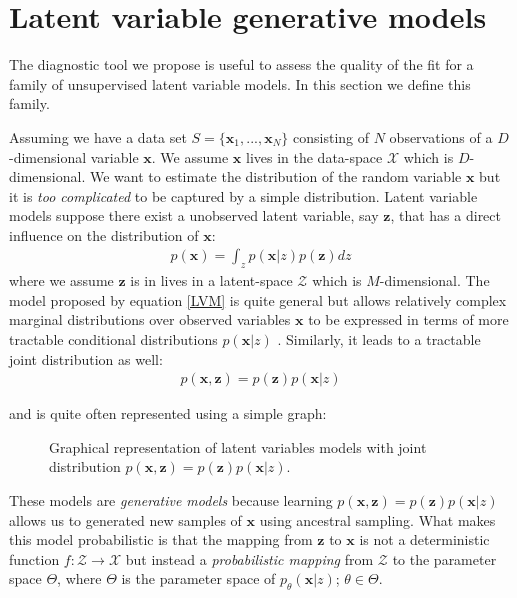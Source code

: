 \documentclass{article}
\newcommand{\x}{\mathbf{x}}
\newcommand{\z}{\mathbf{z}}
\begin{document}
\section{Latent variable generative models}\label{lvm}

The diagnostic tool we propose is useful to assess the quality of the fit for a family of unsupervised latent variable models. In this section we define this family.

\bigskip

Assuming we have a data set $S= \{\mathbf{x}_1,...,\mathbf{x}_N\}$ consisting of $N$ observations of a $D$-dimensional variable $\mathbf{x}$. We assume $\x$ lives in the data-space $\mathcal{X}$ which is $D$-dimensional. We want to estimate the distribution of the random variable $\mathbf{x}$ but it is \textit{too complicated} to be captured by a simple distribution. Latent variable models suppose there exist a unobserved latent variable, say $\mathbf{z}$, that has a direct influence on the distribution of $\mathbf{x}$:
\begin{align}
p(\x) = \int_{z} p(\x|z)p(\z) dz
\label{LVM}
\end{align}
where we assume $\z$ is in lives in a latent-space $\mathcal{Z}$ which is $M$-dimensional. The model proposed by equation \ref{LVM} is quite general but allows relatively complex marginal distributions over observed variables $\mathbf{x}$ to be expressed in terms of more tractable conditional distributions $p(\x|z)$ \cite{Bishop07}. Similarly, it leads to a tractable joint distribution as well:
\begin{align}
p(\x,\z) = p(\z)p(\x|z)
\label{jointLVM}
\end{align}

and is quite often represented using a simple graph:
\begin{figure}[h!]
  \centering
  \caption{Graphical representation of latent variables models with joint distribution $p(\mathbf{x},\mathbf{z}) = p(\mathbf{z})p(\mathbf{x}|z)$.}
  \label{genny}
\end{figure}%
These models are \textit{generative models} because learning $p(\x,\z)= p(\z)p(\x|z)$ allows us to generated new samples of $\x$ using ancestral sampling. What makes this model probabilistic is that the mapping from $\z$
 to $\x$ is not a deterministic function $f: \mathcal{Z} \rightarrow \mathcal{X}$ but instead a \textit{probabilistic mapping} from $\mathcal{Z}$ to the parameter space $\Theta$, where $\Theta$ is the parameter space of $p_\theta(\x|z)$; $\theta \in \Theta$. 
 
\end{document}
